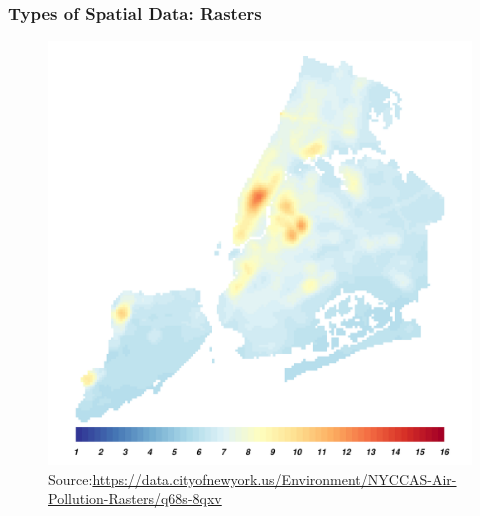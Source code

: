\documentclass[
  shownotes,
  xcolor={svgnames},
  hyperref={colorlinks,citecolor=DarkBlue,linkcolor=DarkRed,urlcolor=DarkBlue}
  ]{beamer}
\begin{document}
\begin{frame}[fragile]
\frametitle{Types of Spatial Data: Rasters}


\begin{figure}[H] \centering
  \centering
\includegraphics[scale=0.40]{figures/NewYork.pdf}
  \\
  \tiny Source:\url{https://data.cityofnewyork.us/Environment/NYCCAS-Air-Pollution-Rasters/q68s-8qxv}
\end{figure}



\end{frame}


\end{document}
